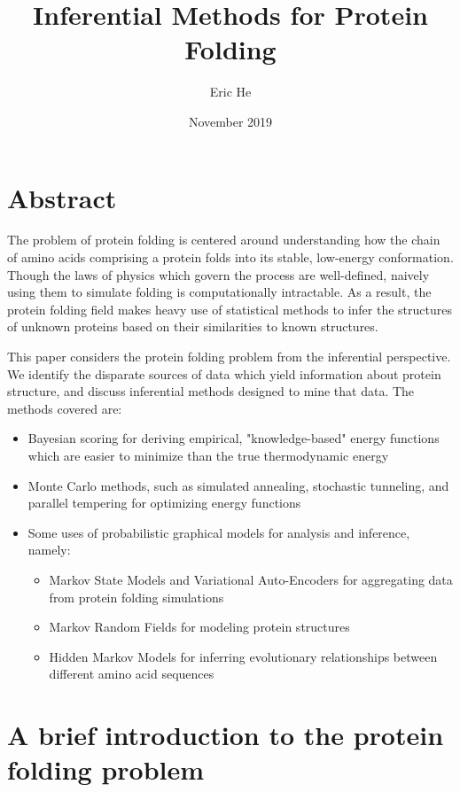 \documentclass{article}
\title{Inferential Methods for Protein Folding}
\author{Eric He}
\date{November 2019}
\begin{document}
\maketitle

\section*{Abstract}
The problem of protein folding is centered around understanding how the chain of amino acids comprising a protein folds into its stable, low-energy conformation. Though the laws of physics which govern the process are well-defined, naively using them to simulate folding is computationally intractable. As a result, the protein folding field makes heavy use of statistical methods to infer the structures of unknown proteins based on their similarities to known structures. 

This paper considers the protein folding problem from the inferential perspective. We identify the disparate sources of data which yield information about protein structure, and discuss inferential methods designed to mine that data. The methods covered are:

\begin{itemize}
    \item Bayesian scoring for deriving empirical, "knowledge-based" energy functions which are easier to minimize than the true thermodynamic energy
    \item Monte Carlo methods, such as simulated annealing, stochastic tunneling, and parallel tempering for optimizing energy functions
    \item Some uses of probabilistic graphical models for analysis and inference, namely:
    \begin{itemize}
        \item Markov State Models and Variational Auto-Encoders for aggregating data from protein folding simulations
        \item Markov Random Fields for modeling protein structures
        \item Hidden Markov Models for inferring evolutionary relationships between different amino acid sequences
    \end{itemize}
\end{itemize}

\newpage
\tableofcontents
\newpage

\section{A brief introduction to the protein folding problem}
\end{document}
